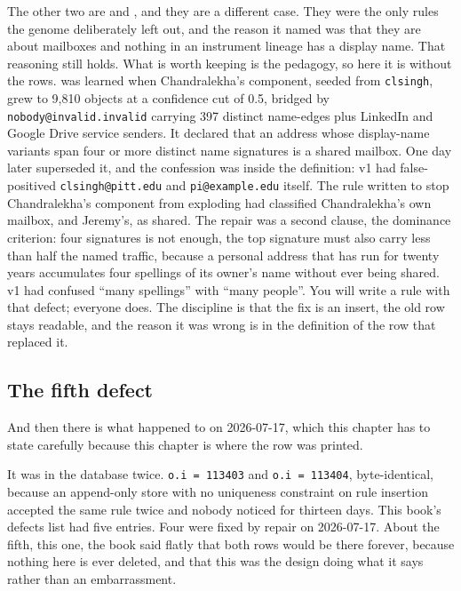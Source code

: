 The other two are  and , and they are a different case. They were the only rules the genome deliberately left out, and the reason it named was that they are about mailboxes and nothing in an instrument lineage has a display name. That reasoning still holds. What is worth keeping is the pedagogy, so here it is without the rows.  was learned when Chandralekha's component, seeded from \texttt{clsingh}, grew to 9,810 objects at a confidence cut of 0.5, bridged by \texttt{nobody@invalid.invalid} carrying 397 distinct name-edges plus LinkedIn and Google Drive service senders. It declared that an address whose display-name variants span four or more distinct name signatures is a shared mailbox. One day later  superseded it, and the confession was inside the definition: v1 had false-positived \texttt{clsingh@pitt.edu} and \texttt{pi@example.edu} itself. The rule written to stop Chandralekha's component from exploding had classified Chandralekha's own mailbox, and Jeremy's, as shared. The repair was a second clause, the dominance criterion: four signatures is not enough, the top signature must also carry less than half the named traffic, because a personal address that has run for twenty years accumulates four spellings of its owner's name without ever being shared. v1 had confused ``many spellings'' with ``many people''. You will write a rule with that defect; everyone does. The discipline is that the fix is an insert, the old row stays readable, and the reason it was wrong is in the definition of the row that replaced it.

\subsection{The fifth defect}

And then there is what happened to  on 2026-07-17, which this chapter has to state carefully because this chapter is where the row was printed.

It was in the database twice. \texttt{o.i = 113403} and \texttt{o.i = 113404}, byte-identical, because an append-only store with no uniqueness constraint on rule insertion accepted the same rule twice and nobody noticed for thirteen days. This book's defects list had five entries. Four were fixed by repair on 2026-07-17. About the fifth, this one, the book said flatly that both rows would be there forever, because nothing here is ever deleted, and that this was the design doing what it says rather than an embarrassment.

